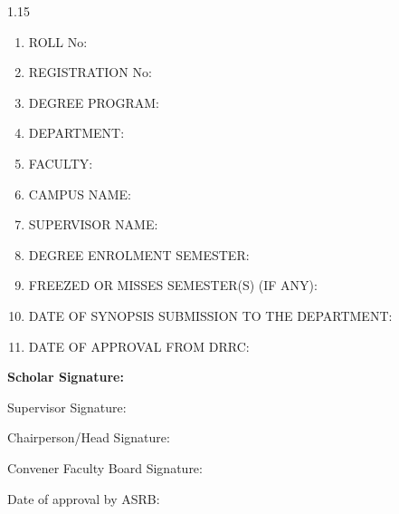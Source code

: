 \begin{spacing}{1.15}
\vspace{4pt}                           %
{\fontsize{14}{18}\selectfont\bfseries\setlength{\parskip}{0pt}
\begin{enumerate}[label=\textbf{\arabic*.},leftmargin=2.2em,itemsep=3pt,topsep=0pt]
  \item ROLL No: \RollNo
  \item REGISTRATION No: \RegistrationNo
  \item DEGREE PROGRAM: \DegreeProgram
  \item DEPARTMENT: \Department
  \item FACULTY: \Faculty
  \item CAMPUS NAME: \CampusName
  \item SUPERVISOR NAME: \SupervisorName
  \item DEGREE ENROLMENT SEMESTER: \EnrolmentSemester
  \item FREEZED OR MISSES SEMESTER(S) (IF ANY): \FreezedSemesters
  \item DATE OF SYNOPSIS SUBMISSION TO THE DEPARTMENT: \SubmissionDate
  \item DATE OF APPROVAL FROM DRRC: \DRRCApprovalDate
\end{enumerate}
\par}

\vspace{12pt}                          %
{\fontsize{14}{18}\selectfont\bfseries\setlength{\parskip}{14pt}
Scholar Signature: \dotfill           %

Supervisor Signature: \dotfill

Chairperson/Head Signature: \dotfill

Convener Faculty Board Signature: \dotfill

Date of approval by ASRB: \dotfill
\par}

\end{spacing}
\clearpage
